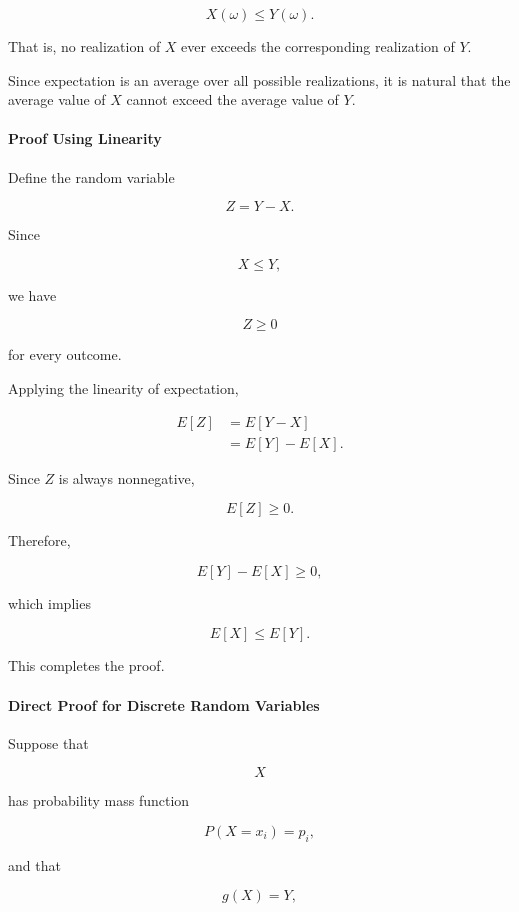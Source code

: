 \documentclass[11pt]{article}
\begin{document}
\begin{mdframed}[
		linewidth=0.8pt,
		roundcorner=6pt,
		backgroundcolor=gray!5,
		linecolor=gray!60,
		innertopmargin=10pt,
		innerbottommargin=10pt,
		innerleftmargin=10pt,
		innerrightmargin=10pt
		]
		\[
		X(\omega)\le Y(\omega).
		\]
		
		That is, no realization of \(X\) ever exceeds the corresponding realization
		of \(Y\).
		
		Since expectation is an average over all possible realizations, it is
		natural that the average value of \(X\) cannot exceed the average value of
		\(Y\).
		
		\bigskip
		
		\paragraph{Proof Using Linearity}
		
		Define the random variable
		
		\[
		Z=Y-X.
		\]
		
		Since
		
		\[
		X\le Y,
		\]
		
		we have
		
		\[
		Z\ge0
		\]
		
		for every outcome.
		
		Applying the linearity of expectation,
		
		\[
		\begin{aligned}
			E[Z]
			&=
			E[Y-X]
			\\[0.3cm]
			&=
			E[Y]-E[X].
		\end{aligned}
		\]
		
		Since \(Z\) is always nonnegative,
		
		\[
		E[Z]\ge0.
		\]
		
		Therefore,
		
		\[
		E[Y]-E[X]\ge0,
		\]
		
		which implies
		
		\[
		\boxed{
			E[X]\le E[Y].
		}
		\]
		
		This completes the proof.
		
		\bigskip
		
		\paragraph{Direct Proof for Discrete Random Variables}
		
		Suppose that
		
		\[
		X
		\]
		
		has probability mass function
		
		\[
		P(X=x_i)=p_i,
		\]
		
		and that
		
		\[
		g(X)=Y,
		\]
		

\end{mdframed}
\end{document}
